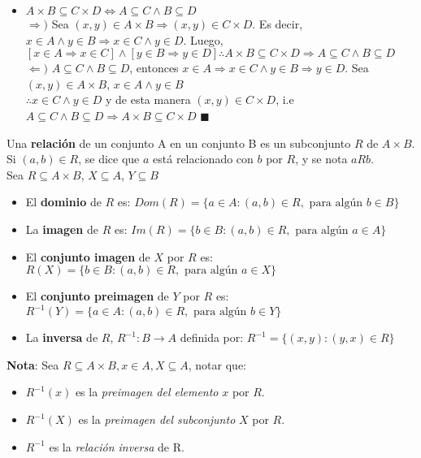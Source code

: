 \documentclass[11pt,a4paper]{article}
\newcommand*{\QEDA}{\null\nobreak\hfill\ensuremath{\blacksquare}}
\begin{document}
\begin{itemize}
\item $A \times B \subseteq C \times D \iff A \subseteq C \land B \subseteq D $\\
$\Rightarrow)$ Sea $(x,y) \in A \times B \Rightarrow (x,y) \in C \times D$. Es decir, $x \in A \land y \in B \Rightarrow x \in C \land y \in D$. Luego, \\ $[x \in A \Rightarrow x \in C] \land [y \in B \Rightarrow y \in D] \therefore A \times B \subseteq C \times D \Rightarrow A \subseteq C \land B \subseteq D$\\
$\Leftarrow)$ $A \subseteq C \land B \subseteq D$, entonces $x \in A \Rightarrow x \in C \land y \in B \Rightarrow y \in D$. Sea $(x,y) \in A\times B$, $x \in A \land y \in B$ \\ $\therefore x \in C \land y \in D$ y de esta manera $(x,y) \in C\times D$, i.e $A \subseteq C \land B \subseteq D \Rightarrow A \times B \subseteq C \times D$ \QEDA
\end{itemize}


\noindent Una \textbf{relaci\'on} de un conjunto A en un conjunto B es un subconjunto $R$ de $A \times B$. Si $(a,b) \in R$, se dice que $a$ est\'a relacionado con $b$ por $R$, y se nota $aRb$.\\

\noindent Sea $R \subseteq A \times B$, $X \subseteq A$, $Y \subseteq B$
\begin{itemize}
\item El \textbf{dominio} de $R$ es: \hfill $Dom(R) = \{ a \in A:(a,b) \in R, \text{ para alg\'un } b\in B \}$
\item La \textbf{imagen} de $R$ es: \hfill $Im(R) = \{ b\in B : (a,b)\in R, \text{ para alg\'un } a \in A \}$
\item El \textbf{conjunto imagen} de $X$ por $R$ es: \hfill $R(X) = \{ b\in B : (a,b) \in R, \text{ para alg\'un } a \in X \}$
\item El \textbf{conjunto preimagen} de $Y$ por $R$ es: \hfill $R^{-1}(Y) = \{ a\in A : (a,b) \in R, \text{ para alg\'un } b \in Y \}$
\item La \textbf{inversa} de $R$, $R^{-1}: B\rightarrow A$ definida por: \hfill $R^{-1} = \{ (x,y):(y,x) \in R \}$\\
\end{itemize}

\noindent \textbf{Nota}: Sea $R \subseteq A \times B, x\in A, X\subseteq A$, notar que:
\begin{itemize}
\item $R^{-1}(x)$ es la \textit{preimagen del elemento} $x$ por $R$.
\item $R^{-1}(X)$ es la \textit{preimagen del subconjunto} $X$ por $R$.
\item $R^{-1}$ es la \textit{relaci\'on inversa} de R.\\
\end{itemize}
\end{document}
